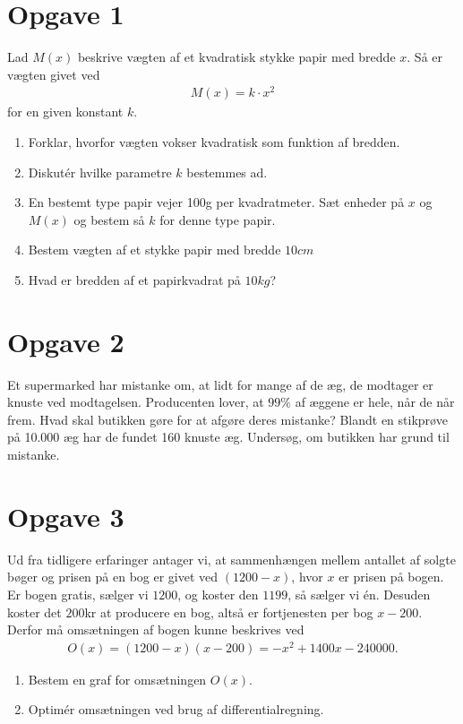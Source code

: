 \section*{Opgave 1}
Lad $M(x)$ beskrive vægten af et kvadratisk stykke papir med bredde $x$. Så er vægten givet ved
\begin{align*}
M(x) = k\cdot x^2
\end{align*}
for en given konstant $k$.
\begin{enumerate}[label=\roman*)]
\item Forklar, hvorfor vægten vokser kvadratisk som funktion af bredden.
\item Diskutér hvilke parametre $k$ bestemmes ad. 
\item En bestemt type papir vejer 100g per kvadratmeter. Sæt enheder på $x$ og $M(x)$ og bestem så $k$ for denne type papir.
\item Bestem vægten af et stykke papir med bredde $10cm$
\item Hvad er bredden af et papirkvadrat på $10kg$?
\end{enumerate}
\section*{Opgave 2}
Et supermarked har mistanke om, at lidt for mange af de æg, de modtager er knuste ved modtagelsen. Producenten lover, at $99\%$ af æggene er hele, når de når frem. Hvad skal butikken gøre for at afgøre deres mistanke? Blandt en stikprøve på 10.000 æg har de fundet 160 knuste æg. Undersøg, om butikken har grund til mistanke.

\section*{Opgave 3}
Ud fra tidligere erfaringer antager vi, at sammenhængen mellem antallet af solgte bøger og prisen på en bog er givet ved $(1200-x)$, hvor $x$ er prisen på bogen. Er bogen gratis, sælger vi $1200$, og koster den $1199$, så sælger vi én. Desuden koster det $200$kr at producere en bog, altså er fortjenesten per bog $x-200$. Derfor må omsætningen af bogen kunne beskrives ved
\begin{align*}
O(x) = (1200-x)(x-200) = -x^2+1400x-240000.
\end{align*}
\begin{enumerate}[label=\roman*)]
\item Bestem en graf for omsætningen $O(x)$. 
\item Optimér omsætningen ved brug af differentialregning. 
\end{enumerate}